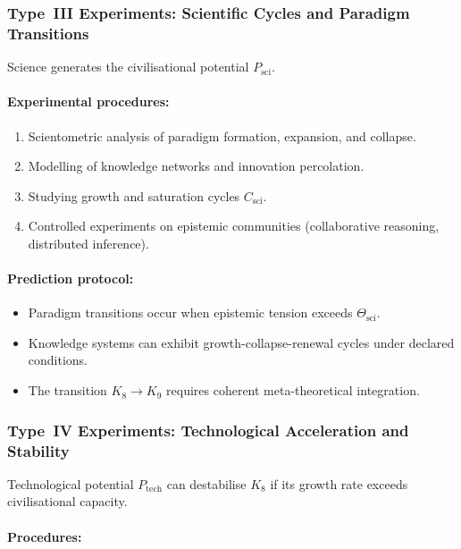 \subsubsection{Type~III Experiments: Scientific Cycles and Paradigm Transitions}

Science generates the civilisational potential $P_{\mathrm{sci}}$.

\paragraph{Experimental procedures:}

\begin{enumerate}
    \item Scientometric analysis of paradigm formation, expansion, and collapse.
    \item Modelling of knowledge networks and innovation percolation.
    \item Studying growth and saturation cycles $C_{\mathrm{sci}}$.
    \item Controlled experiments on epistemic communities 
          (collaborative reasoning, distributed inference).
\end{enumerate}

\paragraph{Prediction protocol:}

\begin{itemize}
    \item Paradigm transitions occur when epistemic tension exceeds 
          $\Theta_{\mathrm{sci}}$.
    \item Knowledge systems can exhibit growth-collapse-renewal cycles under declared conditions.
    \item The transition $K_8 \to K_9$ requires coherent meta-theoretical integration.
\end{itemize}



\subsubsection{Type~IV Experiments: Technological Acceleration and Stability}

Technological potential $P_{\mathrm{tech}}$ can destabilise $K_8$
if its growth rate exceeds civilisational capacity.

\paragraph{Procedures:}

